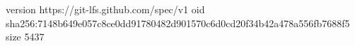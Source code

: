 version https://git-lfs.github.com/spec/v1
oid sha256:7148b649e057c8ce0dd91780482d901570c6d0cd20f34b42a478a556fb7688f5
size 5437
